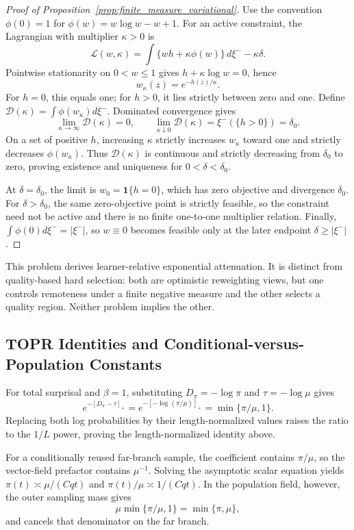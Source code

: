 \documentclass{article}
\theoremstyle{plain}
\theoremstyle{definition}
\theoremstyle{remark}
\begin{document}
\begin{proof}[Proof of Proposition~\ref{prop:finite_measure_variational}]
Use the convention
\(\phi(0)=1\) for
\(\phi(w)=w\log w-w+1\). For an active constraint, the Lagrangian with
multiplier \(\kappa>0\) is
\[
\mathcal L(w,\kappa)
=\int\{wh+\kappa\phi(w)\}\,d\xi^- -\kappa\delta.
\]
Pointwise stationarity on \(0<w\le1\) gives
\(h+\kappa\log w=0\), hence
\[
w_\kappa(z)=e^{-h(z)/\kappa}.
\]
For \(h=0\), this equals one; for \(h>0\), it lies strictly between
zero and one. Define
\(\mathcal D(\kappa)=\int\phi(w_\kappa)d\xi^-\). Dominated convergence gives
\[
\lim_{\kappa\to\infty}\mathcal D(\kappa)=0,
\qquad
\lim_{\kappa\downarrow0}\mathcal D(\kappa)
=\xi^-(\{h>0\})=\delta_0.
\]
On a set of positive \(h\), increasing \(\kappa\) strictly increases
\(w_\kappa\) toward one and strictly decreases \(\phi(w_\kappa)\).
Thus \(\mathcal D(\kappa)\) is continuous and strictly decreasing from
\(\delta_0\) to zero, proving existence and uniqueness for
\(0<\delta<\delta_0\).

At \(\delta=\delta_0\), the limit is
\(w_0=\mathbf1\{h=0\}\), which has zero objective and divergence
\(\delta_0\). For \(\delta>\delta_0\), the same zero-objective point is
strictly feasible, so the constraint need not be active and there is no
finite one-to-one multiplier relation. Finally,
\(\int\phi(0)d\xi^-=|\xi^-|\), so \(w\equiv0\) becomes feasible only at the later
endpoint \(\delta\ge|\xi^-|\).
\end{proof}

This problem derives learner-relative exponential attenuation. It is
distinct from quality-based hard selection: both are optimistic
reweighting views, but one controls remoteness under a finite negative
measure and the other selects a quality region. Neither problem implies
the other.

\subsection{TOPR Identities and Conditional-versus-Population Constants}
\label{app:topr_relation}

For total surprisal and \(\beta=1\), substituting
\(D_\pi=-\log\pi\) and \(\tau=-\log\mu\) gives
\[
e^{-[D_\pi-\tau]_+}
=e^{-[-\log(\pi/\mu)]_+}
=\min\{\pi/\mu,1\}.
\]
Replacing both log probabilities by their length-normalized values
raises the ratio to the \(1/L\) power, proving the
length-normalized identity above.

For a conditionally reused far-branch sample, the coefficient contains
\(\pi/\mu\), so the vector-field prefactor contains \(\mu^{-1}\).
Solving the asymptotic scalar equation yields
\(\pi(t)\asymp\mu/(Cqt)\) and
\(\pi(t)/\mu\asymp1/(Cqt)\). In the population field, however, the
outer sampling mass gives
\[
\mu\min\{\pi/\mu,1\}=\min\{\pi,\mu\},
\]
and cancels that denominator on the far branch.
\end{document}
